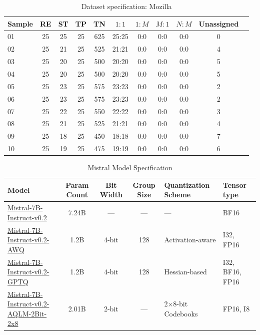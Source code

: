 \documentclass[conference]{IEEEtran}
\begin{document}
\begin{table}[h]
    \centering
    \caption{Dataset specification: Mozilla}
    \begin{tabular}{@{}l|cccccccccc@{}}
    \toprule
    Sample & RE & ST & TP & TN & $1{:}1$ & $1{:}M$ & $M{:}1$ & $N{:}M$ & Unassigned\\
    \midrule
    01 & 25 & 25 & 25 & 625 & 25:25 & 0:0 & 0:0 & 0:0 & 0 \\
    02 & 25 & 21 & 25 & 525 & 21:21 & 0:0 & 0:0 & 0:0 & 4 \\
    03 & 25 & 20 & 25 & 500 & 20:20 & 0:0 & 0:0 & 0:0 & 5 \\
    04 & 25 & 20 & 25 & 500 & 20:20 & 0:0 & 0:0 & 0:0 & 5 \\
    05 & 25 & 23 & 25 & 575 & 23:23 & 0:0 & 0:0 & 0:0 & 2 \\
    06 & 25 & 23 & 25 & 575 & 23:23 & 0:0 & 0:0 & 0:0 & 2 \\
    07 & 25 & 22 & 25 & 550 & 22:22 & 0:0 & 0:0 & 0:0 & 3 \\
    08 & 25 & 21 & 25 & 525 & 21:21 & 0:0 & 0:0 & 0:0 & 4 \\
    09 & 25 & 18 & 25 & 450 & 18:18 & 0:0 & 0:0 & 0:0 & 7 \\
    10 & 25 & 19 & 25 & 475 & 19:19 & 0:0 & 0:0 & 0:0 & 6 \\
    \bottomrule
    \end{tabular}
    \label{tab:mozilla}
\end{table}

\begin{table}[h]
    \centering
    \caption{Mistral Model Specification}
    \begin{tabular}{|| l | c | c | c | l |l||}
    \hline
    \textbf{Model} & Param Count & Bit Width & Group Size & Quantization Scheme & Tensor type \\
    \hline
    \href{https://huggingface.co/mistralai/Mistral-7B-Instruct-v0.2}{Mistral-7B-Instruct-v0.2} & 7.24B & ---    & ---  & --- & BF16 \\
    \href{https://huggingface.co/TheBloke/Mistral-7B-Instruct-v0.2-AWQ}{Mistral-7B-Instruct-v0.2-AWQ}  & 1.2B  & 4-bit & 128 & Activation-aware & I32, FP16 \\
    \href{https://huggingface.co/TheBloke/Mistral-7B-Instruct-v0.2-GPTQ}{Mistral-7B-Instruct-v0.2-GPTQ} & 1.2B  & 4-bit & 128 & Hessian-based & I32, BF16, FP16 \\
    \href{https://huggingface.co/ISTA-DASLab/Mistral-7B-Instruct-v0.2-AQLM-2Bit-2x8}{Mistral-7B-Instruct-v0.2-AQLM-2Bit-2x8} & 2.01B & 2-bit & --- & 2$\times$8-bit Codebooks & FP16, I8 \\
    \hline
    \end{tabular}
\end{table}
\end{document}

